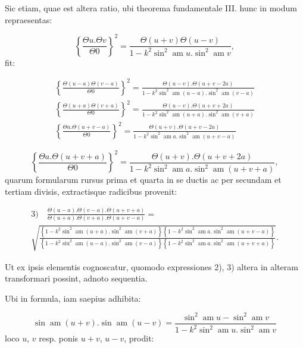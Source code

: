 \documentclass{article}
\begin{document}
Sic etiam, quae est altera ratio, ubi theorema fundamentale III. hunc in modum repraesentas:

\[
\left\{\frac{\Theta u.\Theta v}{\Theta0}\right\}^{2}=\frac{\Theta(u+v)\Theta(u-v)}{1-k^{2}\sin^{2}\operatorname{am}u.\sin^{2}\operatorname{am}v},
\]
fit:

\[
\begin{gathered}
\left\{\frac{\Theta(u-a)\Theta(v-a)}{\Theta0}\right\}^{2}=\frac{\Theta(u-v).\Theta(u+v-2a)}{1-k^{2}\sin^{2}\operatorname{am}(u-a).\sin^{2}\operatorname{am}(v-a)}\\[2ex]
\left\{\frac{\Theta(u+a)\Theta(v+a)}{\Theta0}\right\}^{2}=\frac{\Theta(u-v).\Theta(u+v+2a)}{1-k^{2}\sin^{2}\operatorname{am}(u+a).\sin^{2}\operatorname{am}(v+a)}\\[2ex]
\left\{\frac{\Theta a.\Theta(u+v-a)}{\Theta0}\right\}^{2}=\frac{\Theta(u+v).\Theta(u+v-2a)}{1-k^{2}\sin^{2}\operatorname{am}a.\sin^{2}\operatorname{am}(u+v-a)}
\end{gathered}
\]

\[
\left\{\frac{\Theta a.\Theta(u+v+a)}{\Theta0}\right\}^{2}=\frac{\Theta(u+v).\Theta(u+v+2a)}{1-k^{2}\sin^{2}\operatorname{am}a.\sin^{2}\operatorname{am}(u+v+a)},
\]
quarum formularum rursus prima et quarta in se ductis ac per secundam et tertiam divisis, extractisque radicibus provenit:

\[
\begin{gathered}
\text{3)}\quad \frac{\Theta(u-a).\Theta(v-a).\Theta(u+v+a)}{\Theta(u+a).\Theta(v+a).\Theta(u+v-a)}=\\[1.5ex]
\sqrt{\frac{\left\{1-k^{2}\sin^{2}\operatorname{am}(u+a).\sin^{2}\operatorname{am}(v+a)\right\}\left\{1-k^{2}\sin^{2}\operatorname{am}a.\sin^{2}\operatorname{am}(u+v-a)\right\}}{\left\{1-k^{2}\operatorname{siu}^{2}\operatorname{am}(u-a).\sin^{2}\operatorname{am}(v-a)\right\}\left\{1-k^{2}\sin^{2}\operatorname{am}a.\sin^{2}\operatorname{am}(u+v+a)\right\}}}.
\end{gathered}
\]

Ut ex ipsis elementis cognoscatur, quomodo expressiones 2), 3) altera in alteram transformari possint, adnoto sequentia.

Ubi in formula, iam saepius adhibita:

\[
\sin\operatorname{am}(u+v).\sin\operatorname{am}(u-v)=\frac{\sin^{2}\operatorname{am}u-\sin^{2}\operatorname{am}v}{1-k^{2}\sin^{2}\operatorname{am}u.\sin^{2}\operatorname{am}v}
\]
loco $u$, $v$ resp. ponis $u+v$, $u-v$, prodit:
\end{document}
